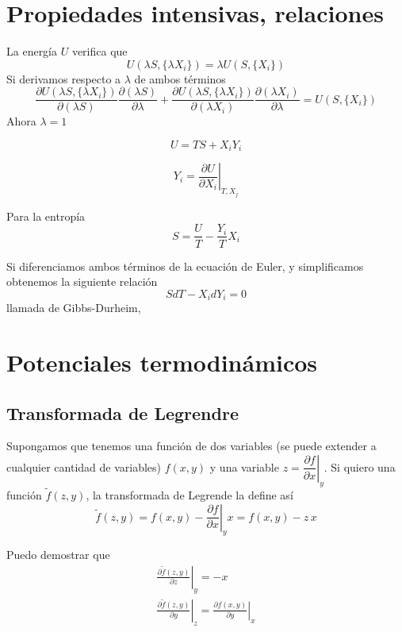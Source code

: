 \documentclass{book}
\numberwithin{equation}{section} %
\begin{document}
\section{Propiedades intensivas, relaciones}
La energía $U$ verifica que
\[ U(\lambda S, \{\lambda X_i \}) = \lambda U(S,\{X_i\}) \]
Si derivamos respecto a $\lambda$ de ambos términos
\[ \frac{\partial U(\lambda S, \{\lambda X_i\})}{\partial (\lambda S)} \frac{\partial (\lambda S)}{\partial \lambda} + \frac{\partial U(\lambda S, \{\lambda X_i\})}{\partial (\lambda X_i)} \frac{\partial (\lambda X_i)}{\partial \lambda} = U(S,\{X_i\})\]
Ahora $\lambda = 1$ 

\begin{equation}
U = T S + X_i Y_i
\label{eq:euler}
\end{equation}

\begin{equation}
Y_i = \left.\frac{\partial U}{\partial X_i}\right|_{T,X_j}
\end{equation}

Para la entropía
\begin{equation}
S = \frac{U}{T} - \frac{Y_i}{T} X_i
\label{eq:euler_entropia}
\end{equation}

Si diferenciamos ambos términos de la ecuación de Euler, y simplificamos obtenemos la siguiente relación
\begin{equation}
S dT - X_i dY_i = 0
\label{eq:gibbs_durheim}
\end{equation}
llamada de Gibbs-Durheim, 


\section{Potenciales termodinámicos}

\subsection{Transformada de Legrendre}
Supongamos que tenemos una función de dos variables (se puede extender a cualquier cantidad de variables) $f(x,y)$ y una variable $z = \left.\dfrac{\partial f}{\partial x}\right|_y$.
Si quiero una función $\tilde{f}(z,y)$, la transformada de Legrende la define así
\begin{equation}
\tilde{f}(z,y) = f(x,y) - \left.\frac{\partial f}{\partial x}\right|_y x = f(x,y) - z\, x
\label{eq:legendre}
\end{equation}

Puedo demostrar que
\begin{equation}
\begin{gathered}
\left.\frac{\partial \tilde{f}(z,y)}{\partial z}\right|_y = - x\\
\left.\frac{\partial \tilde{f}(z,y)}{\partial y}\right|_z = \left.\frac{\partial f(x,y)}{\partial y}\right|_x
\end{gathered}
\end{equation}
\end{document}
